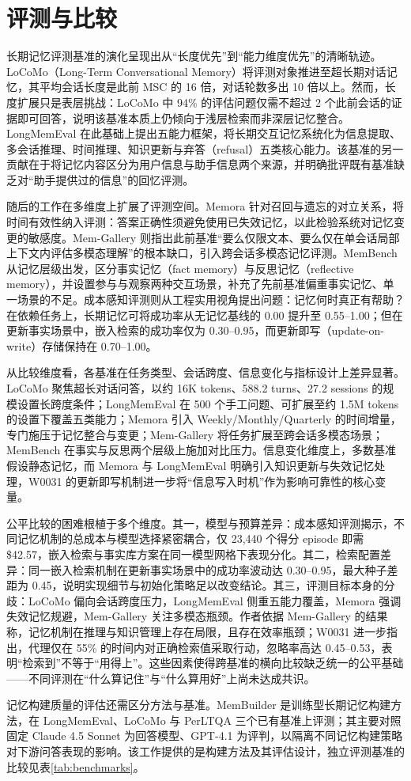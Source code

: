 \section{评测与比较}

长期记忆评测基准的演化呈现出从“长度优先”到“能力维度优先”的清晰轨迹。LoCoMo（Long-Term Conversational Memory）将评测对象推进至超长期对话记忆，其平均会话长度是此前 MSC 的 16 倍，对话轮数多出 10 倍以上\cite{W0005}。然而，长度扩展只是表层挑战：LoCoMo 中 94\% 的评估问题仅需不超过 2 个此前会话的证据即可回答，说明该基准本质上仍倾向于浅层检索而非深层记忆整合\cite{W0171}。LongMemEval 在此基础上提出五能力框架，将长期交互记忆系统化为信息提取、多会话推理、时间推理、知识更新与弃答（refusal）五类核心能力\cite{W0006}。该基准的另一贡献在于将记忆内容区分为用户信息与助手信息两个来源，并明确批评既有基准缺乏对“助手提供过的信息”的回忆评测\cite{W0006}。

随后的工作在多维度上扩展了评测空间。Memora 针对召回与遗忘的对立关系，将时间有效性纳入评测：答案正确性须避免使用已失效记忆，以此检验系统对记忆变更的敏感度\cite{W0171}。Mem-Gallery 则指出此前基准“要么仅限文本、要么仅在单会话局部上下文内评估多模态理解”的根本缺口，引入跨会话多模态记忆评测\cite{W0379}。MemBench 从记忆层级出发，区分事实记忆（fact memory）与反思记忆（reflective memory），并设置参与与观察两种交互场景，补充了先前基准偏重事实记忆、单一场景的不足\cite{W0691}。成本感知评测则从工程实用视角提出问题：记忆何时真正有帮助？在依赖任务上，长期记忆可将成功率从无记忆基线的 0.00 提升至 0.55–1.00；但在更新事实场景中，嵌入检索的成功率仅为 0.30–0.95，而更新即写（update-on-write）存储保持在 0.70–1.00\cite{W0031}。

从比较维度看，各基准在任务类型、会话跨度、信息变化与指标设计上差异显著。LoCoMo 聚焦超长对话问答，以约 16K tokens、588.2 turns、27.2 sessions 的规模设置长跨度条件\cite{W0005}；LongMemEval 在 500 个手工问题、可扩展至约 1.5M tokens 的设置下覆盖五类能力\cite{W0006}；Memora 引入 Weekly/Monthly/Quarterly 的时间增量，专门施压于记忆整合与变更\cite{W0171}；Mem-Gallery 将任务扩展至跨会话多模态场景\cite{W0379}；MemBench 在事实与反思两个层级上施加对比压力\cite{W0691}。信息变化维度上，多数基准假设静态记忆，而 Memora 与 LongMemEval 明确引入知识更新与失效记忆处理\cite{W0006,W0171}，W0031 的更新即写机制进一步将“信息写入时机”作为影响可靠性的核心变量\cite{W0031}。

公平比较的困难根植于多个维度。其一，模型与预算差异：成本感知评测揭示，不同记忆机制的总成本与模型选择紧密耦合，仅 23,440 个得分 episode 即需 \$42.57，嵌入检索与事实库方案在同一模型网格下表现分化\cite{W0031}。其二，检索配置差异：同一嵌入检索机制在更新事实场景中的成功率波动达 0.30–0.95，最大种子差距为 0.45，说明实现细节与初始化策略足以改变结论\cite{W0031}。其三，评测目标本身的分歧：LoCoMo 偏向会话跨度压力，LongMemEval 侧重五能力覆盖，Memora 强调失效记忆规避，Mem-Gallery 关注多模态瓶颈\cite{W0005,W0006,W0171,W0379}。作者依据 Mem-Gallery 的结果称，记忆机制在推理与知识管理上存在局限，且存在效率瓶颈\cite{W0379}；W0031 进一步指出，代理仅在 55\% 的时间内对正确检索值采取行动，忽略率高达 0.45–0.53，表明“检索到”不等于“用得上”\cite{W0031}。这些因素使得跨基准的横向比较缺乏统一的公平基础——不同评测在“什么算记住”与“什么算用好”上尚未达成共识。

记忆构建质量的评估还需区分方法与基准。MemBuilder 是训练型长期记忆构建方法，在 LongMemEval、LoCoMo 与 PerLTQA 三个已有基准上评测；其主要对照固定 Claude 4.5 Sonnet 为回答模型、GPT-4.1 为评判，以隔离不同记忆构建策略对下游问答表现的影响\cite{W0434}。该工作提供的是构建方法及其评估设计，独立评测基准的比较见表\ref{tab:benchmarks}。


